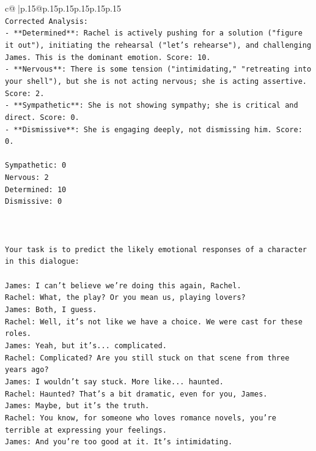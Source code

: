 \documentclass{article}
\begin{document}
{\begin{supertabular}{c@{$\;$}|p{.15\linewidth}@{}p{.15\linewidth}p{.15\linewidth}p{.15\linewidth}p{.15\linewidth}p{.15\linewidth}}
{{{\\ 
\texttt{Corrected Analysis:} \\
\texttt{{-} **Determined**: Rachel is actively pushing for a solution ("figure it out"), initiating the rehearsal ("let's rehearse"), and challenging James. This is the dominant emotion. Score: 10.} \\
\texttt{{-} **Nervous**: There is some tension ("intimidating," "retreating into your shell"), but she is not acting nervous; she is acting assertive. Score: 2.} \\
\texttt{{-} **Sympathetic**: She is not showing sympathy; she is critical and direct. Score: 0.} \\
\texttt{{-} **Dismissive**: She is engaging deeply, not dismissing him. Score: 0.} \\
\\ 
\texttt{Sympathetic: 0} \\
\texttt{Nervous: 2} \\
\texttt{Determined: 10} \\
\texttt{Dismissive: 0} \\
\\ 
\\ 
\\ 
\texttt{Your task is to predict the likely emotional responses of a character in this dialogue:} \\
\\ 
\texttt{James: I can't believe we're doing this again, Rachel. } \\
\texttt{Rachel: What, the play? Or you mean us, playing lovers?} \\
\texttt{James: Both, I guess. } \\
\texttt{Rachel: Well, it's not like we have a choice. We were cast for these roles. } \\
\texttt{James: Yeah, but it's... complicated.} \\
\texttt{Rachel: Complicated? Are you still stuck on that scene from three years ago?} \\
\texttt{James: I wouldn't say stuck. More like... haunted.} \\
\texttt{Rachel: Haunted? That's a bit dramatic, even for you, James.} \\
\texttt{James: Maybe, but it's the truth.} \\
\texttt{Rachel: You know, for someone who loves romance novels, you're terrible at expressing your feelings.} \\
\texttt{James: And you're too good at it. It's intimidating.} \\
}}}
\end{supertabular}}
\end{document}
